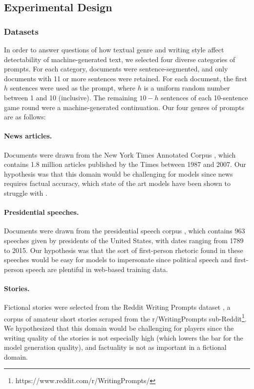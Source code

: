 \subsection{Experimental Design}

\subsubsection{Datasets}
In order to answer questions of how textual genre and writing style affect detectability of machine-generated text, we selected four diverse categories of prompts. 
For each category, documents were sentence-segmented, and only documents with 11 or more sentences were retained.
For each document, the first $h$ sentences were used as the prompt, where $h$ is a uniform random number between 1 and 10 (inclusive). The remaining $10-h$ sentences of each 10-sentence game round were a machine-generated continuation. Our four genres of prompts are as follows:

\paragraph{News articles.}
Documents were drawn from the New York Times Annotated Corpus \citep{sandhaus2008new}, which contains 1.8 million articles published by the Times between 1987 and 2007.
Our hypothesis was that this domain would be challenging for models since news requires factual accuracy, which state of the art models have been shown to struggle with \cite{nakano2021webgpt, lin2021truthfulqa}. 

\paragraph{Presidential speeches.}
Documents were drawn from the presidential speech corpus \citep{brown2016cops}, which contains 963 speeches given by presidents of the United States, with dates ranging from 1789 to 2015.
Our hypothesis was that the sort of first-person rhetoric found in these speeches would be easy for models to impersonate since political speech and first-person speech are plentiful in web-based training data.

\paragraph{Stories.}
Fictional stories were selected from the Reddit Writing Prompts dataset \citep{fan2018hierarchical}, a corpus of amateur short stories scraped from the r/WritingPrompts sub-Reddit\footnote{\tiny https://www.reddit.com/r/WritingPrompts/}. 
We hypothesized that this domain would be challenging for players since the writing quality of the stories is not especially high (which lowers the bar for the model generation quality), and factuality is not as important in a fictional domain.

